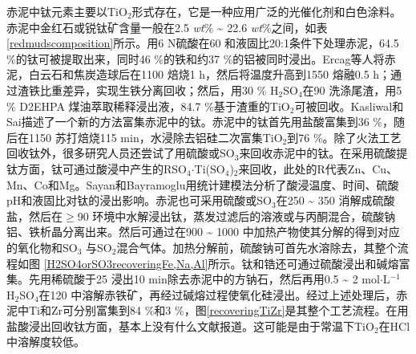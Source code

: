 赤泥中钛元素主要以TiO$ _{\mathrm{2}} $形式存在，它是一种应用广泛的光催化剂和白色涂料。赤泥中金红石或锐钛矿含量一般在2.5 \textit{wt}\% \textasciitilde{ }22.6 \textit{wt}\%之间\cite{grafe2011bauxite}，如表\ref{redmudscomposition}所示。用6 N硫酸在60 \textcelsius 和液固比20:1条件下处理赤泥，64.5 \%的钛可被提取出来\cite{agatzini2008titanium,tsakiridis2011synthesis}，同时46 \%的铁和约37 \%的铝被同时浸出。Ercag\cite{erccaug1997furnace}等人将赤泥，白云石和焦炭造球后在1100 \textcelsius 焙烧1 h，然后将温度升高到1550 \textcelsius 熔融0.5 h；通过渣铁比重差异，实现生铁分离回收；然后，用30 \% H$ _{\mathrm{2}} $SO$ _{\mathrm{4}} $在90 \textcelsius 洗涤尾渣，用5 \% D2EHPA 煤油萃取稀释浸出液，84.7 \%基于渣重的TiO$ _{\mathrm{2}} $可被回收。Kasliwal和Sai\cite{kasliwal1999enrichment}描述了一个新的方法富集赤泥中的钛。赤泥中的钛首先用盐酸富集到36 \%，随后在1150 \textcelsius 苏打焙烧115 min，水浸除去铝硅二次富集TiO$ _{\mathrm{2}} $到76 \%。除了火法工艺回收钛外，很多研究人员还尝试了用硫酸或SO$ _{\mathrm{3}} $来回收赤泥中的钛。在采用硫酸提钛方面\cite{csayan2000statistical,mehta1951recovery}，钛可通过酸浸中产生的RSO$ _{\mathrm{4}} $$ \cdot $Ti(SO$ _{\mathrm{4}} $)$ _{\mathrm{2}} $来回收，此处的R代表Zn、Cu、Mn、Co和Mg。Sayan和Bayramoglu用统计建模法分析了酸浸温度、时间、硫酸pH和液固比对钛的浸出影响。赤泥也可采用硫酸或SO$ _{\mathrm{3}} $在250 \textasciitilde{ }350 \textcelsius 消解成硫酸盐，然后在$ \geq $90 \textcelsius 环境中水解浸出钛\cite{liu2015metallurgical}，蒸发过滤后的溶液或与丙酮混合，硫酸钠铝、铁析晶分离出来。然后可通过在900 \textasciitilde{ }1000 \textcelsius 中加热产物使其分解的得到对应的氧化物和SO$ _{\mathrm{3}} $ 与SO$ _{\mathrm{2}} $混合气体。加热分解前，硫酸钠可首先水溶除去，其整个流程如图 \ref{H2SO4orSO3recoveringFe,Na,Al}所示。钛和锆还可通过硫酸浸出和碱熔富集\cite{kasai1994enrichment}。先用稀硫酸于25 \textcelsius 浸出10 min除去赤泥中的方钠石，然后再用0.5 \textasciitilde{ }2 mol$ \cdot $L$ ^{\mathrm{-1}} $ H$ _{\mathrm{2}} $SO$ _{\mathrm{4}} $在120 \textcelsius 中溶解赤铁矿，再经过碱熔过程使氧化硅浸出。经过上述处理后，赤泥中Ti和Zr可分别富集到84 \%和3 \%，图\ref{recoveringTiZr}是其整个工艺流程。在用盐酸浸出回收钛方面，基本上没有什么文献报道。这可能是由于常温下TiO$ _{\mathrm{2}} $在HCl中溶解度较低\cite{kasai1994enrichment,piga1993recovering}。

